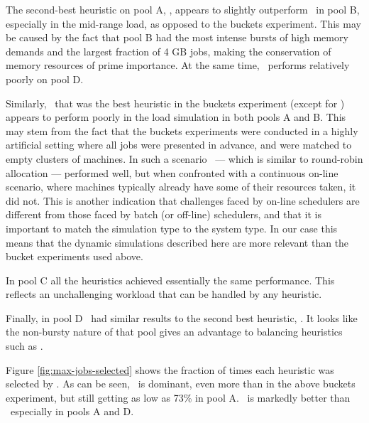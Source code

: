 The second-best heuristic on pool A, \bfm, appears to slightly outperform \mif\ 
in pool B, especially in the mid-range load, as opposed to the buckets
experiment.
This may be caused by the fact that pool B had the most intense bursts
of high memory demands and the largest fraction of 4 GB jobs, making
the conservation of memory resources of prime importance.
At the same time, \bfm\ performs relatively poorly on pool D.

Similarly, \wfc\ that was the best heuristic in the buckets experiment
(except for \mif) appears to perform poorly in the load simulation in
both pools A and B.
This may stem from the fact that the buckets experiments were 
conducted in a highly artificial setting where all jobs were presented
in advance, and were matched to empty clusters of machines.
In such a scenario \wfc\ --- which is similar to round-robin
allocation --- performed well, but when confronted with a continuous
on-line scenario, where machines typically already have some of their
resources taken, it did not.
This is another indication that challenges faced by on-line schedulers are
different from those faced by batch (or off-line) schedulers, and that
it is important to match the simulation type to the system type.
In our case this means that the dynamic simulations described here are
more relevant than the bucket experiments used above.

In pool C all the heuristics achieved essentially the same performance.
This reflects an unchallenging workload that can be handled by any heuristic.

Finally, in pool D \mif\ had similar results to the second best heuristic, \wfc.
It looks like the non-bursty nature of that pool gives an advantage to balancing
heuristics such as \wfc. 


Figure \ref{fig:max-jobs-selected} shows the fraction of
times each heuristic was selected by \maj.
As can be seen, \mif\ is dominant, even more than in the
above buckets experiment, but still getting as low as 73\%
in pool A.
\bfm\ is markedly better than \wfc\ especially in pools A and D.

